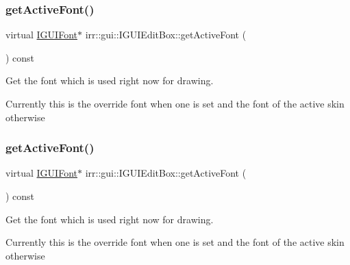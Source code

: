 \subsubsection{\texorpdfstring{get\+Active\+Font()}{getActiveFont()}\hspace{0.1cm}{\footnotesize\ttfamily [1/2]}}
{\footnotesize\ttfamily virtual \hyperlink{classirr_1_1gui_1_1IGUIFont}{I\+G\+U\+I\+Font}$\ast$ irr\+::gui\+::\+I\+G\+U\+I\+Edit\+Box\+::get\+Active\+Font (\begin{DoxyParamCaption}{ }\end{DoxyParamCaption}) const\hspace{0.3cm}{\ttfamily [pure virtual]}}



Get the font which is used right now for drawing. 

Currently this is the override font when one is set and the font of the active skin otherwise \mbox{\label{classirr_1_1gui_1_1IGUIEditBox_a50542fa7f03a48458fac258a0949d987}} 
\subsubsection{\texorpdfstring{get\+Active\+Font()}{getActiveFont()}\hspace{0.1cm}{\footnotesize\ttfamily [2/2]}}
{\footnotesize\ttfamily virtual \hyperlink{classirr_1_1gui_1_1IGUIFont}{I\+G\+U\+I\+Font}$\ast$ irr\+::gui\+::\+I\+G\+U\+I\+Edit\+Box\+::get\+Active\+Font (\begin{DoxyParamCaption}{ }\end{DoxyParamCaption}) const\hspace{0.3cm}{\ttfamily [pure virtual]}}



Get the font which is used right now for drawing. 

Currently this is the override font when one is set and the font of the active skin otherwise \mbox{\label{classirr_1_1gui_1_1IGUIEditBox_a4c5e6749a5ac390d6a10303babd845b8}} 
